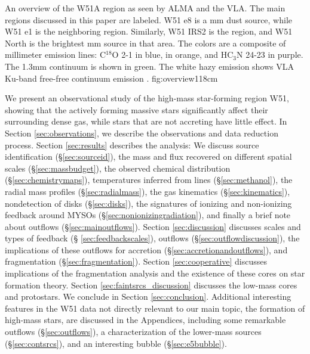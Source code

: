 \documentclass[twocolumn]{aastex61}
\begin{document}
{An overview of the W51A region as seen by ALMA and the VLA.  The main regions
discussed in this paper are labeled.  W51 e8 is a mm dust source, while W51 e1
is the neighboring \hii region.  Similarly, W51 IRS2 is the \hii region, and
W51 North is the brightest mm source in that area.  The colors are a composite
of millimeter emission lines: C$^{18}$O 2-1 in blue, \methanol \fourtwotwo in
orange, and HC$_3$N 24-23 in
purple.  The 1.3mm continuum is shown in green.  The white hazy emission
shows VLA Ku-band free-free continuum emission
\citep{Ginsburg2016b}.}
{fig:overview}{1}{18cm}


We present an observational study of the high-mass star-forming region W51,
showing that the actively forming massive stars significantly affect their
surrounding dense gas, while stars that are not accreting have little effect.
 In Section
\ref{sec:observations}, we describe the observations and data reduction
process.  Section \ref{sec:results} describes the analysis:
We discuss source identification (\S \ref{sec:sourceid}),
the mass and flux recovered on different
spatial scales (\S \ref{sec:massbudget}),
the observed chemical distribution (\S \ref{sec:chemistrymaps}), 
temperatures inferred from \methanol lines (\S \ref{sec:methanol}),
the radial mass profiles (\S \ref{sec:radialmass}), the gas kinematics
(\S \ref{sec:kinematics}), nondetection of disks (\S \ref{sec:disks}),
the signatures of ionizing and non-ionizing feedback around MYSOs
(\S \ref{sec:nonionizingradiation}), and finally a brief note about outflows
(\S \ref{sec:mainoutflows}).
Section \ref{sec:discussion} discusses scales and types of feedback (\S
\ref{sec:feedbackscales}), outflows (\S \ref{sec:outflowdiscussion}),
the implications of these outflows for accretion (\S \ref{sec:accretionandoutflows}),
and fragmentation (\S \ref{sec:fragmentation}).  
Section \ref{sec:cooperative} discusses implications
of the fragmentation analysis and the existence of these cores on star
formation theory.  Section \ref{sec:faintsrcs_discussion} discusses the
low-mass cores and protostars.
We conclude in Section \ref{sec:conclusion}.
Additional interesting features in the W51 data not directly relevant
to our main topic, the formation of high-mass stars,
are discussed in the Appendices, including
some remarkable outflows 
(\S \ref{sec:outflows}),  a characterization of the lower-mass sources
(\S \ref{sec:contsrcs}),
and an interesting bubble (\S \ref{sec:e5bubble}).
\end{document}
